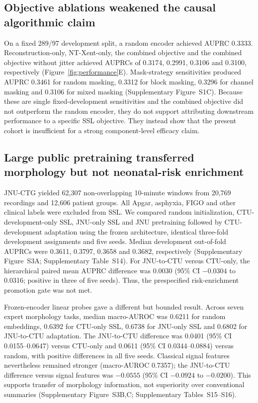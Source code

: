 \documentclass[utf8]{FrontiersinHarvard}
\begin{document}
\subsection{Objective ablations weakened the causal algorithmic claim}

On a fixed 289/97 development split, a random encoder achieved AUPRC 0.3333. Reconstruction-only, NT-Xent-only, the combined objective and the combined objective without jitter achieved AUPRCs of 0.3174, 0.2991, 0.3106 and 0.3100, respectively (Figure~\ref{fig:performance}E). Mask-strategy sensitivities produced AUPRC 0.3461 for random masking, 0.3312 for block masking, 0.3296 for channel masking and 0.3106 for mixed masking (Supplementary Figure~S1C). Because these are single fixed-development sensitivities and the combined objective did not outperform the random encoder, they do not support attributing downstream performance to a specific SSL objective. They instead show that the present cohort is insufficient for a strong component-level efficacy claim.

\subsection{Large public pretraining transferred morphology but not neonatal-risk enrichment}

JNU-CTG yielded 62,307 non-overlapping 10-minute windows from 20,769 recordings and 12,606 patient groups. All Apgar, asphyxia, FIGO and other clinical labels were excluded from SSL. We compared random initialization, CTU-development-only SSL, JNU-only SSL and JNU pretraining followed by CTU-development adaptation using the frozen architecture, identical three-fold development assignments and five seeds. Median development out-of-fold AUPRCs were 0.3611, 0.3797, 0.3658 and 0.3682, respectively (Supplementary Figure~S3A; Supplementary Table~S14). For JNU-to-CTU versus CTU-only, the hierarchical paired mean AUPRC difference was 0.0030 (95\% CI $-0.0304$ to 0.0316; positive in three of five seeds). Thus, the prespecified risk-enrichment promotion gate was not met.

Frozen-encoder linear probes gave a different but bounded result. Across seven expert morphology tasks, median macro-AUROC was 0.6211 for random embeddings, 0.6392 for CTU-only SSL, 0.6738 for JNU-only SSL and 0.6802 for JNU-to-CTU adaptation. The JNU-to-CTU difference was 0.0401 (95\% CI 0.0155--0.0647) versus CTU-only and 0.0611 (95\% CI 0.0344--0.0884) versus random, with positive differences in all five seeds. Classical signal features nevertheless remained stronger (macro-AUROC 0.7357); the JNU-to-CTU difference versus signal features was $-0.0555$ (95\% CI $-0.0924$ to $-0.0200$). This supports transfer of morphology information, not superiority over conventional summaries (Supplementary Figure~S3B,C; Supplementary Tables~S15--S16).
\end{document}
